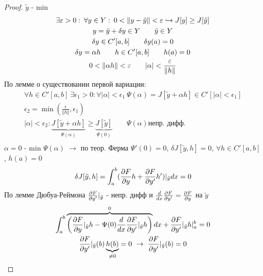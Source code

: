 \documentclass{article}
\begin{document}
\begin{proof}
  $\tilde{y}$ - min 
  \begin{gather*}
    \exists \varepsilon > 0: \: \forall y\in Y : \: 0<\Vert y-\tilde{y} \Vert < \varepsilon \hookrightarrow J[y] \ge J[\tilde{y}] \\ 
    y=\tilde{y}+\delta y \in Y \qquad \tilde{y} \in Y \\ 
    \delta y \in C'[a,b] \qquad \delta y (a)=0 \\ 
    \delta y =\alpha h \qquad h \in C'[a,b] \qquad h(a)=0  \\ 
    0 < \Vert \alpha h \Vert < \varepsilon \qquad |\alpha| < \frac{\varepsilon}{\Vert h \Vert}
  \end{gather*}
  По лемме о существовании первой вариации:
  \begin{gather*}
    \forall h \in C'[a,b] \  \exists \epsilon_1 > 0 : \forall |\alpha| < \epsilon_1 \ 
    \Psi(\alpha)=J[\tilde{y}+\alpha h] \in C'[|\alpha|<\epsilon_1] \\ 
    \epsilon_2 = \min(\frac{\epsilon}{\Vert h \Vert}, \epsilon_1) \\ 
    |\alpha| < \epsilon_2 : \underbrace{J[\tilde{y}+\alpha h]}_{\Psi(\alpha)} \ge \underbrace{J[\tilde{y}]}_{\Psi(0)} \qquad \Psi(\alpha) \text{непр. дифф.} \\ 
  \end{gather*}
  $\alpha =0$ - min $\Psi(\alpha)$ $\rightarrow$ по теор. Ферма $\Psi'(0)=0$, 
  $\delta J[\tilde{y},h]=0$, $\forall h \in C'[a,b]$, $h(a)=0$
  \begin{gather*}
    \delta J[\tilde{y}, h]= \int_{a}^{b}(\frac{\partial{F}}{\partial{y}}h+\frac{\partial{F}}{\partial{y'}}h')|_{\tilde{y}}dx = 0
  \end{gather*}
  По лемме Дюбуа-Реймона $\frac{\partial{F}}{\partial{y'}}|_{\tilde{y}}$ - непр. дифф и $\frac{d}{dx}\frac{\partial{F}}{\partial{y'}}=\frac{\partial{F}}{\partial{y}}$ на $\tilde{y}$
  \begin{gather*}
    \int_{a}^{b}\overbrace{\left(\frac{\partial{F}}{\partial{y}}|_{\tilde{y}}h-\Psi(0)\frac{d}{dx}\frac{\partial{F}}{\partial{y'}}|_{\tilde{y}}h\right)}^{0}dx + \frac{\partial{F}}{\partial{y'}}|_{\tilde{y}}h|_{a}^{b}=0 \\ 
    \frac{\partial{F}}{\partial{y'}}|_{\tilde{y}}(b)\underbrace{h(b)}_{\neq 0}=0 \  \rightarrow \ \frac{\partial{F}}{\partial{y'}}|_{\tilde{y}}(b)=0
  \end{gather*}
\end{proof}

\end{document}
